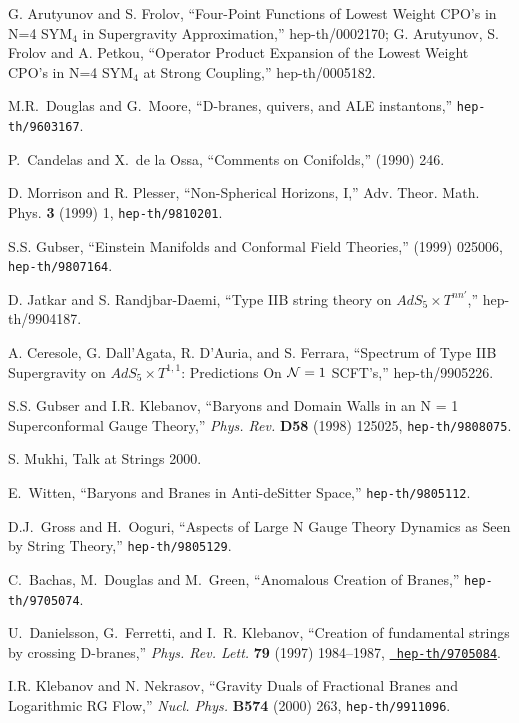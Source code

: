 \begin{thebibliography}{99}

G. Arutyunov and S. Frolov, 
``Four-Point Functions of Lowest Weight CPO's in N=4 SYM$_4$
in Supergravity Approximation,'' hep-th/0002170;
G. Arutyunov, S. Frolov and A. Petkou,
``Operator Product Expansion of the Lowest Weight CPO's 
in N=4 SYM$_4$ at Strong Coupling,'' hep-th/0005182.

M.R.~Douglas and G.~Moore, ``D-branes, quivers, and ALE instantons,''
{{\tt hep-th/9603167}}.

P.~Candelas and X.~de la Ossa, ``Comments on Conifolds,''
 (1990) 246.

D. Morrison and R. Plesser,
``Non-Spherical Horizons, I,''
Adv. Theor. Math. Phys. {\bf 3} (1999) 1,  {\tt hep-th/9810201}.

S.S. Gubser, ``Einstein Manifolds and Conformal Field Theories,''
 (1999) 025006, {{\tt hep-th/9807164}}.

D. Jatkar and S. Randjbar-Daemi,
``Type IIB string theory on $AdS_5 \times T^{nn'}$,''
hep-th/9904187.

A. Ceresole, G. Dall'Agata, R. D'Auria, and S. Ferrara,
``Spectrum of Type IIB Supergravity on $AdS_5\times T^{1,1}$:
Predictions
On ${\cal N}=1$ SCFT's,'' hep-th/9905226.

S.S. Gubser and I.R. Klebanov,
``Baryons and Domain Walls in an N = 1 Superconformal Gauge Theory,''
{\em Phys. Rev.} {\bf D58} (1998) 125025,
{{\tt hep-th/9808075}}.

S. Mukhi, Talk at Strings 2000.

E.~Witten, ``Baryons and Branes in Anti-deSitter Space,''
{{\tt hep-th/9805112}}.

D.J.~Gross and H.~Ooguri, ``Aspects of Large N Gauge Theory Dynamics
as Seen by String Theory,''
{{\tt hep-th/9805129}}.

C.~Bachas, M.~Douglas and M.~Green, ``Anomalous Creation of Branes,''
{{\tt hep-th/9705074}}.

U.~Danielsson, G.~Ferretti, and I.~R. Klebanov, ``Creation of fundamental
  strings by crossing D-branes,'' {\em Phys. Rev. Lett.} {\bf 79} (1997)
  1984--1987, \href{http://xxx.lanl.gov/abs/hep-th/9705084}{{\tt
  hep-th/9705084}}.

I.R. Klebanov and N. Nekrasov, 
``Gravity Duals of Fractional Branes and Logarithmic RG Flow,''
{\em Nucl. Phys.} {\bf B574} (2000) 263,
{\tt hep-th/9911096}.


\end{thebibliography}
